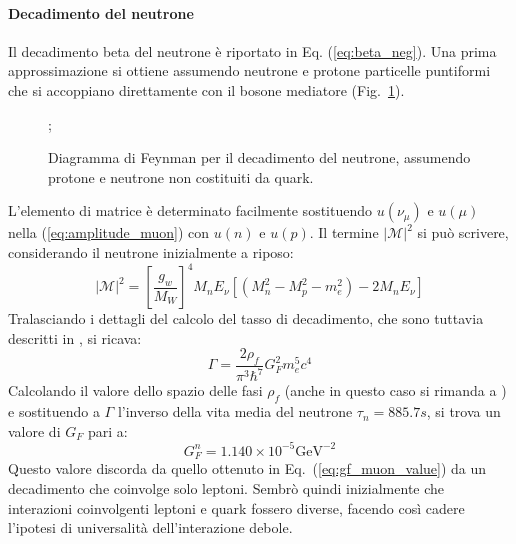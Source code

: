 \documentclass{subnucbo}
\begin{document}
\paragraph{Decadimento del neutrone}
Il decadimento beta del neutrone è riportato in Eq. (\ref{eq:beta_neg}).
Una prima approssimazione si ottiene assumendo neutrone e protone particelle puntiformi che si accoppiano direttamente con il bosone mediatore (Fig.~\ref{fig:neutron_decay_simple}).
\begin{figure}[!h]
        \centering
        ;
        \caption{Diagramma di Feynman per il decadimento del neutrone, assumendo protone e neutrone non costituiti da quark.}
        \label{fig:neutron_decay_simple}
\end{figure}
L'elemento di matrice è determinato facilmente sostituendo $u(\nu_{\mu})$ e $u(\mu)$ nella (\ref{eq:amplitude_muon}) con $u(n)$ e $u(p)$. Il termine $|\mathcal{M}|^{2}$ si può scrivere, considerando il neutrone inizialmente a riposo:
\begin{equation}
        | \mathcal { M } | ^ { 2 } = \left[ \frac { g _ { w } } { M _ { W } } \right] ^ { 4 } M _ { n } E _ { \nu } \left[ \left( M _ { n } ^ { 2 } - M _ { p } ^ { 2 } - m _ { e } ^ { 2 } \right) - 2 M _ { n } E _ { \nu } \right]
\end{equation}
Tralasciando i dettagli del calcolo del tasso di decadimento, che sono tuttavia descritti in \cite{ref:hayes}, si ricava:
\begin{equation}
        \Gamma = \frac { 2 \rho_{f} } { \pi ^ { 3 } \hbar ^ { 7 } } G _ { F } ^ { 2 } m _ { e } ^ { 5 } c ^ { 4 }
        \label{eq:neutron_decay_rate}
\end{equation}
Calcolando il valore dello spazio delle fasi $\rho_{f}$ (anche in questo caso si rimanda a \cite{ref:hayes}) e sostituendo a $\Gamma$ l'inverso della vita media del neutrone $\tau_{n}=885.7 s$, si trova un valore di $G_{F}$ pari a:
\begin{equation}
        G^{n} _ { F } = 1.140 \times 10 ^ { - 5 } \mathrm { GeV } ^ { - 2 }
        \label{eq:gf_neutron_value}
\end{equation}
Questo valore discorda da quello ottenuto in Eq.~(\ref{eq:gf_muon_value}) da un decadimento che coinvolge solo leptoni. Sembrò quindi inizialmente che interazioni coinvolgenti leptoni e quark fossero diverse, facendo così cadere l'ipotesi di universalità dell'interazione debole.
\end{document}
